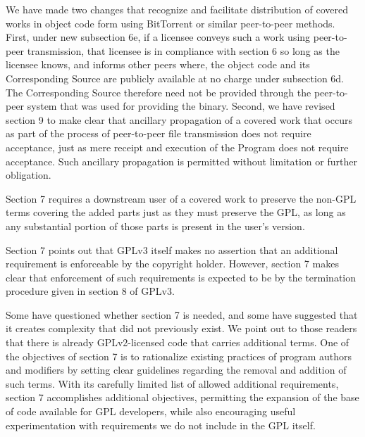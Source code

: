 
We have made two changes that recognize and facilitate distribution of
covered works in object code form using BitTorrent or similar peer-to-peer
methods.  First, under new subsection 6e, if a licensee conveys such a work
using peer-to-peer transmission, that licensee is in compliance with section
6 so long as the licensee knows, and informs other peers where, the object
code and its Corresponding Source are publicly available at no charge under
subsection 6d.  The Corresponding Source therefore need not be provided
through the peer-to-peer system that was used for providing the binary.
Second, we have revised section 9 to make clear that ancillary propagation of
a covered work that occurs as part of the process of peer-to-peer file
transmission does not require acceptance, just as mere receipt and execution
of the Program does not require acceptance.  Such ancillary propagation is
permitted without limitation or further obligation.



Section 7 requires a downstream user of a covered work to preserve the
non-GPL terms covering the added parts just as they must preserve the GPL, as
long as any substantial portion of those parts is present in the user's
version.


Section 7 points out that GPLv3 itself makes no assertion that an additional
requirement is enforceable by the copyright holder.  However, section 7 makes
clear that enforcement of such requirements is expected to be by the
termination procedure given in section 8 of GPLv3.


Some have questioned whether section 7 is needed, and some have suggested
that it creates complexity that did not previously exist.  We point out to
those readers that there is already GPLv2-licensed code that carries
additional terms.  One of the objectives of section 7 is to rationalize
existing practices of program authors and modifiers by setting clear
guidelines regarding the removal and addition of such terms.  With its
carefully limited list of allowed additional requirements, section 7
accomplishes additional objectives, permitting the expansion of the base of
code available for GPL developers, while also encouraging useful
experimentation with requirements we do not include in the GPL itself.

